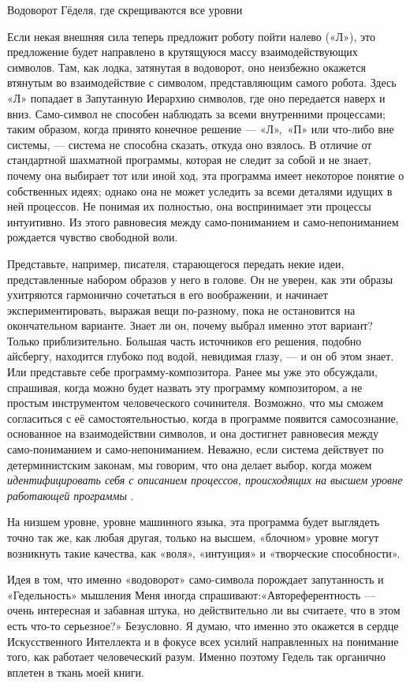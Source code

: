 \documentclass[../main.tex]{subfiles}
\begin{document}
Водоворот Гёделя, где скрещиваются все уровни

Если некая внешняя сила теперь предложит роботу пойти налево («Л»), это предложение будет направлено в крутящуюся массу взаимодействующих символов. Там, как лодка, затянутая в водоворот, оно неизбежно окажется втянутым во взаимодействие с символом, представляющим самого робота. Здесь «Л» попадает в Запутанную Иерархию символов, где оно передается наверх и вниз. Само-символ не способен наблюдать за всеми внутренними процессами; таким образом, когда принято конечное решение --- «Л»,~«П» или что-либо вне системы, --- система не способна сказать, откуда оно взялось. В отличие от стандартной шахматной программы, которая не следит за собой и не знает, почему она выбирает тот или иной ход, эта программа имеет некоторое понятие о собственных идеях; однако она не может уследить за всеми деталями идущих в ней процессов. Не понимая их полностью, она воспринимает эти процессы интуитивно. Из этого равновесия между само-пониманием и само-непониманием рождается чувство свободной воли.

Представьте, например, писателя, старающегося передать некие идеи, представленные набором образов у него в голове. Он не уверен, как эти образы ухитряются гармонично сочетаться в его воображении, и начинает экспериментировать, выражая вещи по-разному, пока не остановится на окончательном варианте. Знает ли он, почему выбрал именно этот вариант? Только приблизительно. Большая часть источников его решения, подобно айсбергу, находится глубоко под водой, невидимая глазу, --- и он об этом знает. Или представьте себе программу-композитора. Ранее мы уже это обсуждали, спрашивая, когда можно будет назвать эту программу композитором, а не простым инструментом человеческого сочинителя. Возможно, что мы сможем согласиться с её самостоятельностью, когда в программе появится самосознание, основанное на взаимодействии символов, и она достигнет равновесия между само-пониманием и само-непониманием. Неважно, если система действует по детерминистским законам, мы говорим, что она делает выбор, когда можем \emph{идентифицировать себя с описанием процессов, происходящих на высшем уровне работающей программы} .

На низшем уровне, уровне машинного языка, эта программа будет выглядеть точно так же, как любая другая, только на высшем, «блочном» уровне могут возникнуть такие качества, как «воля», «интуиция» и «творческие способности».

Идея в том, что именно «водоворот» само-символа порождает запутанность и «Гедельность» мышления Меня иногда спрашивают:«Автореферентность --- очень интересная и забавная штука, но действительно ли вы считаете, что в этом есть что-то серьезное?» Безусловно. Я думаю, что именно это окажется в сердце Искусственного Интеллекта и в фокусе всех усилий направленных на понимание того, как работает человеческий разум. Именно поэтому Гедель так органично вплетен в ткань моей книги.
\end{document}
